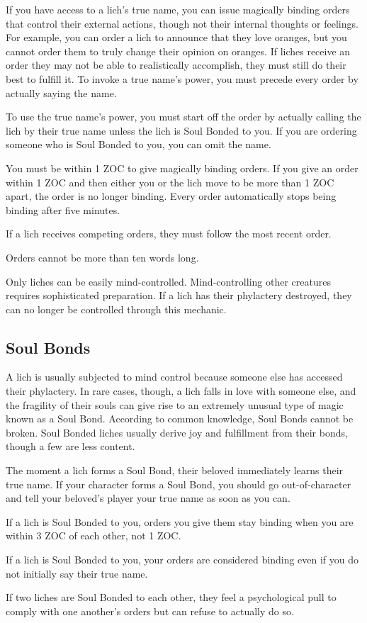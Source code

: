 \documentclass[green]{Sel}
\begin{document}
\name{\gMindControl{}}
If you have access to a lich’s true name, you can issue magically binding orders that control their external actions, though not their internal thoughts or feelings. For example, you can order a lich to announce that they love oranges, but you cannot order them to truly change their opinion on oranges. If liches receive an order they may not be able to realistically accomplish, they must still do their best to fulfill it. To invoke a true name’s power, you must precede every order by actually saying the name.

To use the true name’s power, you must start off the order by actually calling the lich by their true name unless the lich is Soul Bonded to you. If you are ordering someone who is Soul Bonded to you, you can omit the name.

You must be within 1 ZOC to give magically binding orders. If you give an order within 1 ZOC and then either you or the lich move to be more than 1 ZOC apart, the order is no longer binding. Every order automatically stops being binding after five minutes.

If a lich receives competing orders, they must follow the most recent order.

Orders cannot be more than ten words long.

Only liches can be easily mind-controlled. Mind-controlling other creatures requires sophisticated preparation. If a lich has their phylactery destroyed, they can no longer be controlled through this mechanic.

\subsection{Soul Bonds}

A lich is usually subjected to mind control because someone else has accessed their phylactery. In rare cases, though, a lich falls in love with someone else, and the fragility of their souls can give rise to an extremely unusual type of magic known as a Soul Bond. According to common knowledge, Soul Bonds cannot be broken. Soul Bonded liches usually derive joy and fulfillment from their bonds, though a few are less content.

The moment a lich forms a Soul Bond, their beloved immediately learns their true name. If your character forms a Soul Bond, you should go out-of-character and tell your beloved’s player your true name as soon as you can.

If a lich is Soul Bonded to you, orders you give them stay binding when you are within 3 ZOC of each other, not 1 ZOC.

If a lich is Soul Bonded to you, your orders are considered binding even if you do not initially say their true name.

If two liches are Soul Bonded to each other, they feel a psychological pull to comply with one another’s orders but can refuse to actually do so.
\end{document}
